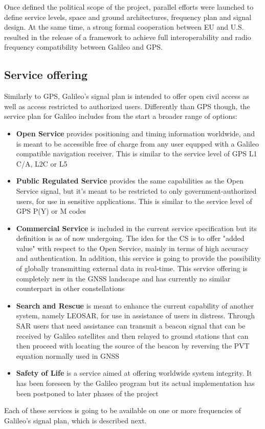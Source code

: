 Once defined the political scope of the project, parallel efforts were launched
to define service levels, space and ground architectures, frequency plan and
signal design. At the same time, a strong formal cooperation between EU and U.S.
resulted in the release of a framework to achieve full interoperability and
radio frequency compatibility between Galileo and GPS.

\subsection{Service offering}
Similarly to GPS, Galileo's signal plan is intended to offer open civil access
as well as access restricted to authorized users. Differently than GPS though,
the service plan for Galileo includes from the start a broader range of options:
\begin{itemize}
  \item \textbf{Open Service} provides positioning and timing information
    worldwide, and is meant to be accessible free of charge from any user
    equpped with a Galileo compatible navigation receiver. This is similar to
    the service level of GPS L1 C/A, L2C or L5
  \item \textbf{Public Regulated Service} provides the same capabilities as the
    Open Service signal, but it's meant to be restricted to only
    government-authorized users, for use in sensitive applications. This is
    similar to the service level of GPS P(Y) or M codes
  \item \textbf{Commercial Service} is included in the current service
    specification but its definition is as of now undergoing. The idea for
    the CS is to offer "added value" with respect to the Open Service, mainly in
    terms of high accuracy and authentication. In addition, this service is
    going to provide the possibility of globally transmitting external data in
    real-time. This service offering is completely new in the GNSS landscape and
    has currently no similar counterpart in other constellations
  \item \textbf{Search and Rescue} is meant to enhance the current capability of
    another system, namely LEOSAR, for use in assistance of users in distress.
    Through SAR users that need assistance can transmit a beacon signal that can
    be received by Galileo satellites and then relayed to ground stations
    that can then proceed with locating the source of the beacon by reversing
    the PVT equation normally used in GNSS
  \item \textbf{Safety of Life} is a service aimed at offering worldwide system
    integrity. It has been foreseen by the Galileo program but its actual
    implementation has been postponed to later phases of the project
\end{itemize}
Each of these services is going to be available on one or more frequencies of
Galileo's signal plan, which is described next.

